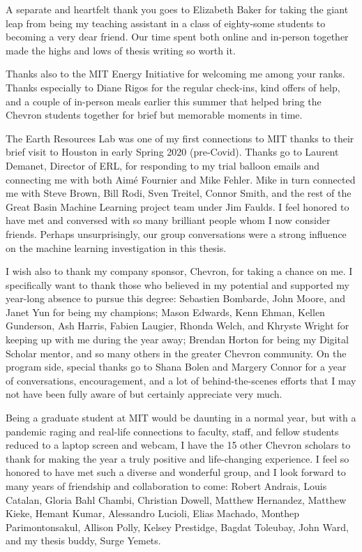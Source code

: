 A separate and heartfelt thank you goes to Elizabeth Baker for taking the giant leap from being my teaching assistant in a class of eighty-some students to becoming a very dear friend. Our time spent both online and in-person together made the highs and lows of thesis writing so worth it.

Thanks also to the MIT Energy Initiative for welcoming me among your ranks. Thanks especially to Diane Rigos for the regular check-ins, kind offers of help, and a couple of in-person meals earlier this summer that helped bring the Chevron students together for brief but memorable moments in time.

The Earth Resources Lab was one of my first connections to MIT thanks to their brief visit to Houston in early Spring 2020 (pre-Covid). Thanks go to Laurent Demanet, Director of ERL, for responding to my trial balloon emails and connecting me with both Aim\'e Fournier and Mike Fehler. Mike in turn connected me with Steve Brown, Bill Rodi, Sven Treitel, Connor Smith, and the rest of the Great Basin Machine Learning project team under Jim Faulds. I feel honored to have met and conversed with so many brilliant people whom I now consider friends. Perhaps unsurprisingly, our group conversations were a strong influence on the machine learning investigation in this thesis.

I wish also to thank my company sponsor, Chevron, for taking a chance on me. I specifically want to thank those who believed in my potential and supported my year-long absence to pursue this degree: Sebastien Bombarde, John Moore, and Janet Yun for being my champions; Mason Edwards, Kenn Ehman, Kellen Gunderson, Ash Harris, Fabien Laugier, Rhonda Welch, and Khryste Wright for keeping up with me during the year away; Brendan Horton for being my Digital Scholar mentor, and so many others in the greater Chevron community. On the program side, special thanks go to Shana Bolen and Margery Connor for a year of conversations, encouragement, and a lot of behind-the-scenes efforts that I may not have been fully aware of but certainly appreciate very much.

Being a graduate student at MIT would be daunting in a normal year, but with a pandemic raging and real-life connections to faculty, staff, and fellow students reduced to a laptop screen and webcam, I have the 15 other Chevron scholars to thank for making the year a truly positive and life-changing experience. I feel so honored to have met such a diverse and wonderful group, and I look forward to many years of friendship and collaboration to come: Robert Andrais, Louis Catalan, Gloria Bahl Chambi, Christian Dowell, Matthew Hernandez, Matthew Kieke, Hemant Kumar, Alessandro Lucioli, Elias Machado, Monthep Parimontonsakul, Allison Polly, Kelsey Prestidge, Bagdat Toleubay, John Ward, and my thesis buddy, Surge Yemets.

